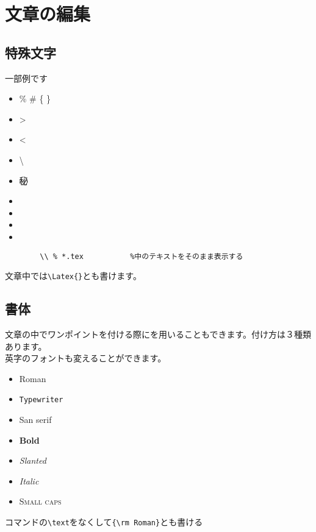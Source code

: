 \documentclass{jsarticle}					%
\begin{document}
\pagebreak

\section{文章の編集}
\subsection{特殊文字}
	一部例です
	\begin{itemize}
		\item \% \# \{ \} 		%
		\item \textgreater		%
		\item \textless		%
		\item \textbackslash	%
		\item \textcircled{\scriptsize 秘}	%
		\item {}		%
		\item \return			%
		\item \Return		%
		\item \yen			%
	\end{itemize}
	\begin{verbatim}
		\\ % *.tex　			%中のテキストをそのまま表示する
	\end{verbatim}
	文章中では\verb|\Latex{}|とも書けます。
	
\subsection{書体}
	文章の中で{\gtfamily ワンポイント}を付ける際にを用いることもできます。付け方は{\gt ３種類}あります。\\
	英字のフォントも変えることができます。\\
	\begin{itemize}
		\item \textrm{Roman}		%
		\item \texttt{Typewriter}	%
		\item \textsf{San serif}		%
		\item \textbf{Bold}			%
		\item \textsl{Slanted}		%
		\item \textit{Italic}			%
		\item \textsc{Small caps}	%
	\end{itemize}
	コマンドの\verb|\text|をなくして\verb|{\rm Roman}|とも書ける
\end{document}
